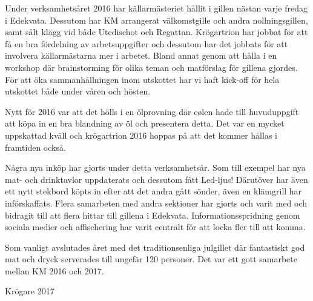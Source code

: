\documentclass[../_main/handlingar.tex]{subfiles}
\begin{document}
Under verksamhetsåret 2016 har källarmästeriet hållit i gillen nästan varje fredag i Edekvata. Dessutom har KM arrangerat välkomstgille och andra nollningsgillen, samt sålt klägg vid både Utedischot och Regattan.
Krögartrion har jobbat för att få en bra fördelning av arbetsuppgifter och dessutom har det jobbats för att involvera källarmästarna mer i arbetet. Bland annat genom att hålla i en workshop där brainstorming för olika teman och matförslag för gillena gjordes. För att öka sammanhållningen inom utskottet har vi haft kick-off för hela utskottet både under våren och hösten.

Nytt för 2016 var att det hölls i en ölprovning där cølen hade till huvuduppgift att köpa in en bra blandning av öl och presentera detta. Det var en mycket uppskattad kväll och krögartrion 2016 hoppas på att det kommer hållas i framtiden också.

Några nya inköp har gjorts under detta verksamhetsår. Som till exempel har nya mat- och drinktavlor uppdaterats och dessutom fått Led-ljus! Därutöver har även ett nytt stekbord köpts in efter att det andra gått sönder, även en klämgrill har införskaffats.
Flera samarbeten med andra sektioner har gjorts och varit med och bidragit till att flera hittar till gillena i Edekvata. Informationsspridning genom sociala medier och affischering har varit centralt för att locka fler till att komma.

Som vanligt avslutades året med det traditionsenliga julgillet där fantastiskt god mat och dryck serverades till ungefär 120 personer.  Det var ett gott samarbete mellan KM 2016 och 2017.
\begin{signatures}{1}
    \mvh
    \signature{Markus Rahne}{Krögare 2017}
\end{signatures}
\end{document}
